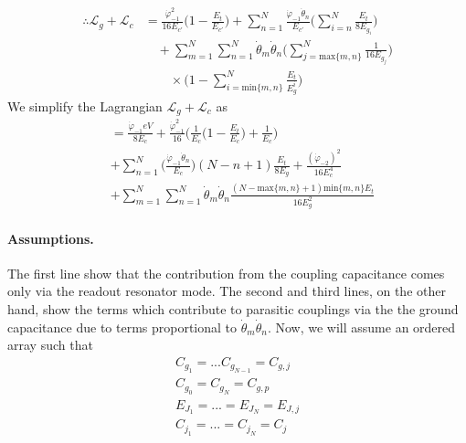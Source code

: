 \documentclass[%
reprint,
superscriptaddress,
 amsmath,amssymb,
 aps,
 prx,
longbibliography,
floatfix,
]{revtex4-2}
\begin{document}
\begin{align}
\therefore     \mathcal{L}_g+\mathcal{L}_c&=\frac{\dot{\varphi}^2_{-1}}{16E_{c'}}\Big(1-\frac{E_t}{E_{c'}}\Big)+\sum_{n=1}^N\frac{\dot{\varphi}_{-1}\dot{\theta}_n}{E_{c'}}\Big(\sum_{i=n}^N\frac{E_t}{8E_{g_i}}\Big)\nonumber\\&\quad+\sum_{m=1}^N\sum_{n=1}^N\dot{\theta}_m\dot{\theta}_{n}\Big( \sum_{j=\text{max}\{m,n\}}^N\frac{1}{16E_{g_j}}\Big)\nonumber\\&\quad\quad
\times\Big(1-\sum_{i=\text{min}\{m,n\}}^N\frac{E_t}{E_g^i}\Big)
\end{align}
We simplify the Lagrangian $\mathcal{L}_g+\mathcal{L}_c$ as
\begin{align}
    &=\frac{\dot{\varphi}_{-1}eV}{8E_c}+\frac{\dot{\varphi}^2_{-1}}{16}\Big(\frac{1}{E_c}\Big(1-\frac{E_t}{E_c}\Big)+\frac{1}{E_c}\Big)\nonumber\\&+\sum_{n=1}^N\Big(\frac{\dot{\varphi}_{-1}\dot{\theta}_n}{E_c}\Big)(N-n+1)\frac{E_t}{8E_g}+\frac{(\dot{\varphi}_{-2})^2}{16E^4_{c}}\nonumber\\
&+\sum_{m=1}^N\sum_{n=1}^N\dot{\theta}_m\dot{\theta}_{n} \frac{(N-\text{max}\{m,n\}+1)\text{min}\{m,n\}E_t}{16E_g^2}
\end{align}
\paragraph{Assumptions.} 
The first line show that the contribution from the coupling capacitance comes only via the readout resonator mode. The second and third lines, on the other hand, show the terms which contribute to parasitic couplings via the the ground capacitance due to terms proportional to $\dot{\theta}_m\dot{\theta}_n$. Now, we will assume an ordered array such that
\begin{align*}
    C_{g_1}=...C_{g_{N-1}}=C_{g,j} \\
    C_{g_0}=C_{g_N}=C_{g,p} \\
    E_{J_1}=...=E_{J_N}=E_{J,j} \\
    C_{j_1}=...=C_{j_N}=C_{j} 
\end{align*}
\end{document}
